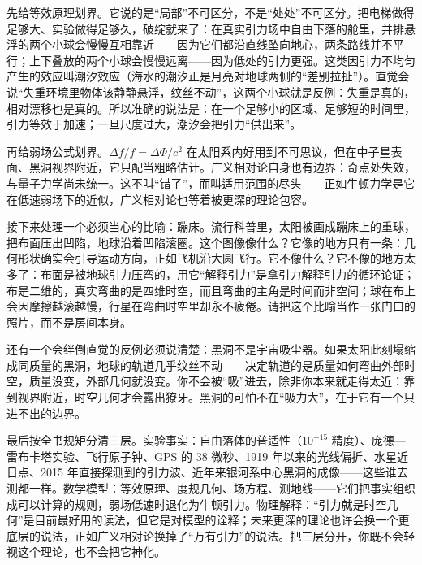 \begin{mainline}
先给等效原理划界。它说的是“局部”不可区分，不是“处处”不可区分。把电梯做得足够大、实验做得足够久，破绽就来了：在真实引力场中自由下落的舱里，并排悬浮的两个小球会慢慢互相靠近——因为它们都沿直线坠向地心，两条路线并不平行；上下叠放的两个小球会慢慢远离——因为低处的引力更强。这类因引力不均匀产生的效应叫潮汐效应（海水的潮汐正是月亮对地球两侧的“差别拉扯”）。直觉会说“失重环境里物体该静静悬浮，纹丝不动”，这两个小球就是反例：失重是真的，相对漂移也是真的。所以准确的说法是：在一个足够小的区域、足够短的时间里，引力等效于加速；一旦尺度过大，潮汐会把引力“供出来”。

再给弱场公式划界。\(\Delta f/f=\Delta\Phi/c^{2}\) 在太阳系内好用到不可思议，但在中子星表面、黑洞视界附近，它只配当粗略估计。广义相对论自身也有边界：奇点处失效，与量子力学尚未统一。这不叫“错了”，而叫适用范围的尽头——正如牛顿力学是它在低速弱场下的近似，广义相对论也等着被更深的理论包容。

接下来处理一个必须当心的比喻：蹦床。流行科普里，太阳被画成蹦床上的重球，把布面压出凹陷，地球沿着凹陷滚圈。这个图像像什么？它像的地方只有一条：几何形状确实会引导运动方向，正如飞机沿大圆飞行。它不像什么？它不像的地方太多了：布面是被地球引力压弯的，用它“解释引力”是拿引力解释引力的循环论证；布是二维的，真实弯曲的是四维时空，而且弯曲的主角是时间而非空间；球在布上会因摩擦越滚越慢，行星在弯曲时空里却永不疲倦。请把这个比喻当作一张门口的照片，而不是房间本身。

还有一个会绊倒直觉的反例必须说清楚：黑洞不是宇宙吸尘器。如果太阳此刻塌缩成同质量的黑洞，地球的轨道几乎纹丝不动——决定轨道的是质量如何弯曲外部时空，质量没变，外部几何就没变。你不会被“吸”进去，除非你本来就走得太近：靠到视界附近，时空几何才会露出獠牙。黑洞的可怕不在“吸力大”，在于它有一个只进不出的边界。

最后按全书规矩分清三层。实验事实：自由落体的普适性（\(10^{-15}\) 精度）、庞德—雷布卡塔实验、飞行原子钟、GPS 的 38 微秒、1919 年以来的光线偏折、水星近日点、2015 年直接探测到的引力波、近年来银河系中心黑洞的成像——这些谁去测都一样。数学模型：等效原理、度规几何、场方程、测地线——它们把事实组织成可以计算的规则，弱场低速时退化为牛顿引力。物理解释：“引力就是时空几何”是目前最好用的读法，但它是对模型的诠释；未来更深的理论也许会换一个更底层的说法，正如广义相对论换掉了“万有引力”的说法。把三层分开，你既不会轻视这个理论，也不会把它神化。
\end{mainline}



